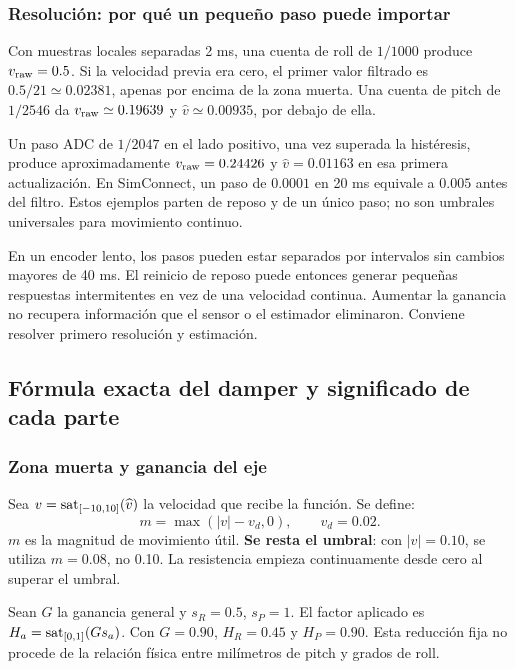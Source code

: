 \subsubsection{Resolución: por qué un pequeño paso puede importar}
Con muestras locales separadas 2 ms, una cuenta de roll de $1/1000$ produce $v_{\rm raw}=0.5$. Si la velocidad previa era cero, el primer valor filtrado es $0.5/21\simeq0.02381$, apenas por encima de la zona muerta. Una cuenta de pitch de $1/2546$ da $v_{\rm raw}\simeq0.19639$ y $\widehat v\simeq0.00935$, por debajo de ella.

Un paso ADC de $1/2047$ en el lado positivo, una vez superada la histéresis, produce aproximadamente $v_{\rm raw}=0.24426$ y $\widehat v=0.01163$ en esa primera actualización. En SimConnect, un paso de $0.0001$ en 20 ms equivale a $0.005$ antes del filtro. Estos ejemplos parten de reposo y de un único paso; no son umbrales universales para movimiento continuo.

En un encoder lento, los pasos pueden estar separados por intervalos sin cambios mayores de 40 ms. El reinicio de reposo puede entonces generar pequeñas respuestas intermitentes en vez de una velocidad continua. Aumentar la ganancia no recupera información que el sensor o el estimador eliminaron. Conviene resolver primero resolución y estimación.

\subsection{Fórmula exacta del damper y significado de cada parte}
\subsubsection{Zona muerta y ganancia del eje}
Sea $v=\operatorname{sat}_{[-10,10]}(\widehat v)$ la velocidad que recibe la función. Se define:
\begin{equation}
m=\max(|v|-v_d,0),\qquad v_d=0.02.
\label{eq:movimiento_util}
\end{equation}
$m$ es la magnitud de movimiento útil. \textbf{Se resta el umbral}: con $|v|=0.10$, se utiliza $m=0.08$, no 0.10. La resistencia empieza continuamente desde cero al superar el umbral.

Sean $G$ la ganancia general y $s_R=0.5$, $s_P=1$. El factor aplicado es $H_a=\operatorname{sat}_{[0,1]}(G s_a)$. Con $G=0.90$, $H_R=0.45$ y $H_P=0.90$. Esta reducción fija no procede de la relación física entre milímetros de pitch y grados de roll.

